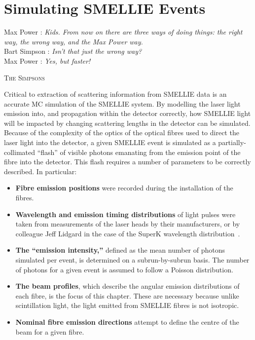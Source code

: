 \chapter{Simulating SMELLIE Events}\label{chap:beam_profiling}
\setlength{\epigraphwidth}{.6\textwidth}
\epigraph{Max Power : \textit{Kids. From now on there are three ways of doing things: the right way, the wrong way, and the Max Power way.}\\
Bart Simpson : \textit{Isn't that just the wrong way?}\\
Max Power : \textit{Yes, but faster!}}{\textsc{The Simpsons}}
\setlength{\epigraphwidth}{.4\textwidth}
Critical to extraction of scattering information from SMELLIE data is an accurate MC simulation of the SMELLIE system. By modelling the laser light emission into, and propagation within the detector correctly, how SMELLIE light will be impacted by changing scattering lengths in the detector can be simulated. Because of the complexity of the optics of the optical fibres used to direct the laser light into the detector, a given SMELLIE event is simulated as a partially-collimated ``flash'' of visible photons emanating from the emission point of the fibre into the detector. This flash requires a number of parameters to be correctly described. In particular:
\begin{itemize}
    \item \textbf{Fibre emission positions} were recorded during the installation of the fibres.
    \item \textbf{Wavelength and emission timing distributions} of light pulses were taken from measurements of the laser heads by their manufacturers, or by colleague Jeff Lidgard in the case of the SuperK wavelength distribution~\cite{lidgardSupercontinuumAdditionSMELLIE2018}.
    \item \textbf{The ``emission intensity,''} defined as the mean number of photons simulated per event, is determined on a subrun-by-subrun basis. The number of photons for a given event is assumed to follow a Poisson distribution. 
    \item \textbf{The beam profiles}, which describe the angular emission distributions of each fibre, is the focus of this chapter. These are necessary because unlike scintillation light, the light emitted from SMELLIE fibres is not isotropic.
    \item \textbf{Nominal fibre emission directions} attempt to define the centre of the beam for a given fibre.
\end{itemize}

